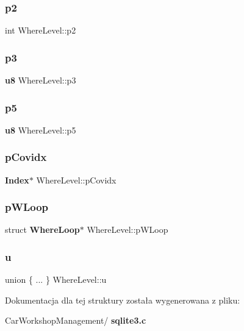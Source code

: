 \subsubsection{p2}
{\footnotesize\ttfamily int Where\+Level\+::p2}

\mbox{\label{struct_where_level_a350b6471be36b98926c357c75658865f}} 
\subsubsection{p3}
{\footnotesize\ttfamily \textbf{ u8} Where\+Level\+::p3}

\mbox{\label{struct_where_level_a568ee11c7ecabb4259836ccc11025ae6}} 
\subsubsection{p5}
{\footnotesize\ttfamily \textbf{ u8} Where\+Level\+::p5}

\mbox{\label{struct_where_level_a2fda58df1378666ed5fcc12c40c6e141}} 
\subsubsection{pCovidx}
{\footnotesize\ttfamily \textbf{ Index}$\ast$ Where\+Level\+::p\+Covidx}

\mbox{\label{struct_where_level_ac40ed0531ae966eabe77e10f29fb56f3}} 
\subsubsection{pWLoop}
{\footnotesize\ttfamily struct \textbf{ Where\+Loop}$\ast$ Where\+Level\+::p\+W\+Loop}

\mbox{\label{struct_where_level_aa8fdec1d1286221ec8a6146bee035d9e}} 
\subsubsection{u}
{\footnotesize\ttfamily union \{ ... \}   Where\+Level\+::u}



Dokumentacja dla tej struktury została wygenerowana z pliku\+:\begin{DoxyCompactItemize}
\item 
Car\+Workshop\+Management/\textbf{ sqlite3.\+c}\end{DoxyCompactItemize}
